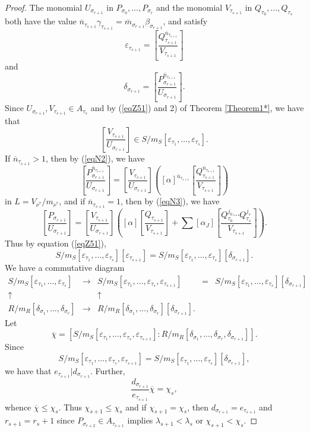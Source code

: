 \documentclass[11pt]{amsart}
\let\epsilon\varepsilon
\begin{document}
\begin{proof}
 The monomial $U_{\sigma_{r+1}}$ in $P_{\sigma_0},\ldots, P_{\sigma_r}$ and the monomial $V_{\tau_{s+1}}$ in $Q_{\tau_0},\ldots, Q_{\tau_s}$ both have the value
 $\overline n_{\tau_{s+1}}\gamma_{\tau_{s+1}}=\overline m_{\sigma_{r+1}}\beta_{\sigma_{r+1}}$, and satisfy
 $$
 \epsilon_{\tau_{s+1}}=\left[\frac{Q_{\tau_{s+1}}^{\overline n_{\tau_{s+1}}}}{V_{\tau_{s+1}}}\right]
 $$
 and
 $$
 \delta_{\sigma_{r+1}}=\left[\frac{P_{\sigma_{r+1}}^{\overline n_{\tau_{s+1}}}}{U_{\sigma_{r+1}}}\right].
 $$
 Since $U_{\sigma_{r+1}}, V_{\tau_{s+1}}\in A_{\tau_s}$ and by (\ref{eqZ51}) and 2) of Theorem \ref{Theorem1*}, 
 we have that
 $$
 \left[\frac{V_{\tau_{s+1}}}{U_{\sigma_{r+1}}}\right]\in S/m_S[\epsilon_{\tau_1},\ldots,\epsilon_{\tau_s}].
 $$
 If $\overline n_{\tau_{s+1}}>1$, then by (\ref{eqN2}), we have
 $$
 \left[\frac{P_{\sigma_{r+1}}^{\overline n_{\tau_{s+1}}}}{U_{\sigma_{r+1}}}\right]
 =\left[\frac{V_{\tau_{s+1}}}{U_{\sigma_{r+1}}}\right]
 \left(\left[\alpha\right]^{\overline n_{\tau_{s+1}}}\left[\frac{Q_{\tau_{s+1}}^{\overline n_{\tau_{s+1}}}}{V_{\tau_{s+1}}}\right]\right)
 $$
 in $L=V_{\nu^*}/m_{\nu^*}$, and if $\overline n_{\tau_{s+1}}=1$, then by (\ref{eqN3}), we have
 $$
 \left[\frac{P_{\sigma_{r+1}}}{U_{\sigma_{r+1}}}\right]
 =\left[\frac{V_{\tau_{s+1}}}{U_{\sigma_{r+1}}}\right]
 \left(\left[\alpha\right]\left[\frac{Q_{\tau_{s+1}}}{V_{\tau_{s+1}}}\right]
 +\sum\left[\alpha_J\right]\left[\frac{Q_{\tau_0}^{j_0}\cdots Q_{\tau_s}^{j_s}}{V_{\tau_{s+1}}}
 \right] \right) .
 $$ 
 Thus by equation (\ref{eqZ51}),
 \begin{equation}\label{eqN4}
 S/m_S[\epsilon_{\tau_1},\ldots,\epsilon_{\tau_s}][\epsilon_{\tau_{s+1}}]=S/m_S[\epsilon_{\tau_1},\ldots,\epsilon_{\tau_s}][\delta_{\sigma_{r+1}}].
 \end{equation}
 We have a commutative diagram
 $$
 \begin{array}{ccccc}
S/m_S[\epsilon_{\tau_1},\ldots,\epsilon_{\tau_s}]&\rightarrow& S/m_S[\epsilon_{\tau_1},\ldots,\epsilon_{\tau_s},\epsilon_{\tau_{s+1}}]&=& S/m_S[\epsilon_{\tau_1},\ldots,\epsilon_{\tau_s}][\delta_{\sigma_{r+1}}]\\
\uparrow&&\uparrow\\
R/m_R[\delta_{\sigma_1},\ldots,\delta_{\sigma_r}]&\rightarrow&R/m_R[\delta_{\sigma_1},\ldots,\delta_{\sigma_r}][\delta_{\sigma_{r+1}}].
\end{array}
$$
Let
$$
\overline\chi=[S/m_S[\epsilon_{\tau_1},\ldots,\epsilon_{\tau_s},\epsilon_{\tau_{s+1}}]:R/m_R[\delta_{\sigma_1},\ldots,\delta_{\sigma_r},\delta_{\sigma_{r+1}}]].
$$
Since 
$$
S/m_S[\epsilon_{\tau_1},\ldots,\epsilon_{\tau_s},\epsilon_{\tau_{s+1}}]= S/m_S[\epsilon_{\tau_1},\ldots,\epsilon_{\tau_s}][\delta_{\sigma_{r+1}}],
$$
we have that $e_{\tau_{s+1}}|d_{\sigma_{r+1}}$. Further, 
$$
\frac{d_{\sigma_{r+1}}}{e_{\tau_{s+1}}}\overline\chi=\chi_s,
$$
whence $\overline\chi\le\chi_s$. Thus $\chi_{s+1}\le\chi_s$ and if $\chi_{s+1}=\chi_s$, then  $d_{\sigma_{r+1}}=e_{\tau_{s+1}}$ and $r_{s+1}=r_s+1$  since $P_{\sigma_{r+2}}\in A_{\tau_{s+1}}$ implies $\lambda_{s+1}<\lambda_s$ or $\chi_{s+1}<\chi_s$.


\end{proof}
\end{document}
